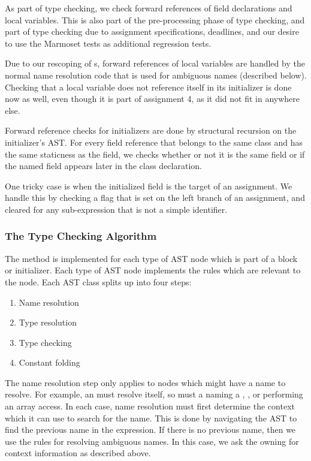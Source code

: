 \documentclass[pdftex,11pt,a4paper]{article}
\begin{document}
As part of type checking, we check forward references of field
declarations and local variables. This is also part of the
pre-processing phase of type checking, and part of type checking
due to assignment specifications, deadlines, and our desire to use the
Marmoset tests as additional regression tests.

Due to our rescoping of s, forward references of local
variables are handled by the normal name resolution code that is used
for ambiguous names (described below). Checking that a local variable
does not reference itself in its initializer is done now as well, even though
it is part of assignment 4, as it did not fit in anywhere else.

Forward reference checks for  initializers are done by
structural recursion on the  initializer's AST. For every
field reference that belongs to the same class and has the same
staticness as the field, we checks whether or not it is the same field
or if the named field appears later in the class declaration.

One tricky case is when the initialized field is the target of an
assignment. We handle this by checking a flag that is set on the left
branch of an assignment, and cleared for any sub-expression that is
not a simple identifier.

\subsubsection{The Type Checking Algorithm}

The  method is implemented for each type of AST node
which is part of a  block or  initializer. Each
type of AST node implements the rules which are relevant to the node.
Each AST class splits up  into four steps:

\begin{enumerate}
  \item Name resolution
  \item Type resolution
  \item Type checking
  \item Constant folding
\end{enumerate}

The name resolution step only applies to nodes which might have a name
to resolve. For example, an  must resolve itself, so
must a  naming a , , or
performing an array access. In each case, name resolution must first
determine the context which it can use to search for the name. This is
done by navigating the AST to find the previous name in the
expression. If there is no previous name, then we use the rules for
resolving ambiguous names. In this case, we ask the owning 
for context information as described above.
\end{document}
